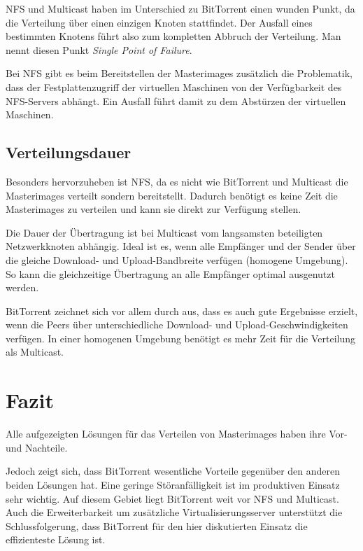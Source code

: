 NFS und Multicast haben im Unterschied zu BitTorrent einen wunden Punkt, da die Verteilung über einen einzigen Knoten stattfindet. Der Ausfall eines bestimmten Knotens führt also zum kompletten Abbruch der Verteilung. Man nennt diesen Punkt \textit{Single Point of Failure}. 

Bei NFS gibt es beim Bereitstellen der Masterimages zusätzlich die Problematik, dass der Festplattenzugriff der virtuellen Maschinen von der Verfügbarkeit des NFS-Servers abhängt. Ein Ausfall führt damit zu dem Abstürzen der virtuellen Maschinen.


\subsection{Verteilungsdauer}
Besonders hervorzuheben ist NFS, da es nicht wie BitTorrent und Multicast die Masterimages verteilt sondern bereitstellt. Dadurch benötigt es keine Zeit die Masterimages zu verteilen und kann sie direkt zur Verfügung stellen. 

Die Dauer der Übertragung ist bei Multicast vom langsamsten beteiligten Netzwerkknoten abhängig. Ideal ist es, wenn alle Empfänger und der Sender über die gleiche Download- und Upload-Bandbreite verfügen (homogene Umgebung). So kann die gleichzeitige Übertragung an alle Empfänger optimal ausgenutzt werden.

BitTorrent zeichnet sich vor allem durch aus, dass es auch gute Ergebnisse erzielt, wenn die Peers über unterschiedliche Download- und Upload-Geschwindigkeiten verfügen. In einer homogenen Umgebung benötigt es mehr Zeit für die Verteilung als Multicast. 

\section{Fazit}

Alle aufgezeigten Lösungen für das Verteilen von Masterimages haben ihre Vor- und Nachteile. 
\begin{comment} Wie der Vergleich zeigt sind alle 3 für den produktiven Einsatz geeignet.\end{comment}
Jedoch zeigt sich, dass BitTorrent wesentliche Vorteile gegenüber den anderen beiden Lösungen hat. Eine geringe Störanfälligkeit ist im produktiven Einsatz sehr wichtig. Auf diesem Gebiet liegt BitTorrent weit vor NFS und Multicast. Auch die Erweiterbarkeit um zusätzliche Virtualisierungsserver unterstützt die Schlussfolgerung, dass BitTorrent für den hier diskutierten Einsatz die effizienteste Lösung ist.
